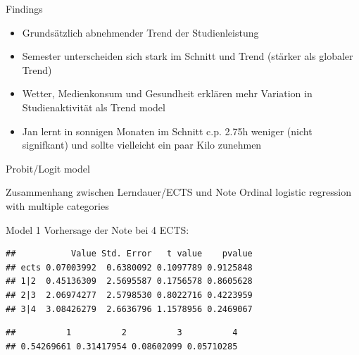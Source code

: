 \documentclass[
  ignorenonframetext,
]{beamer}
\providecommand{\tightlist}{%
  \setlength{\itemsep}{0pt}\setlength{\parskip}{0pt}}
\begin{document}
\begin{frame}
\begin{block}{Findings}
\protect\hypertarget{findings}{}
\begin{itemize}
\tightlist
\item
  Grundsätzlich abnehmender Trend der Studienleistung
\item
  Semester unterscheiden sich stark im Schnitt und Trend (stärker als
  globaler Trend)
\item
  Wetter, Medienkonsum und Gesundheit erklären mehr Variation in
  Studienaktivität als Trend model
\item
  Jan lernt in sonnigen Monaten im Schnitt c.p. 2.75h weniger (nicht
  signifkant) und sollte vielleicht ein paar Kilo zunehmen
\end{itemize}
\end{block}
\end{frame}

\begin{frame}[fragile]{Probit/Logit model}
\protect\hypertarget{probitlogit-model}{}
\begin{block}{Zusammenhang zwischen Lerndauer/ECTS und Note}
\protect\hypertarget{zusammenhang-zwischen-lerndauerects-und-note}{}
Ordinal logistic regression with multiple categories
\end{block}

\begin{block}{Model 1}
\protect\hypertarget{model-1}{}
Vorhersage der Note bei 4 ECTS:

\begin{verbatim}
##           Value Std. Error   t value    pvalue
## ects 0.07003992  0.6380092 0.1097789 0.9125848
## 1|2  0.45136309  2.5695587 0.1756578 0.8605628
## 2|3  2.06974277  2.5798530 0.8022716 0.4223959
## 3|4  3.08426279  2.6636796 1.1578956 0.2469067
\end{verbatim}

\begin{verbatim}
##          1          2          3          4 
## 0.54269661 0.31417954 0.08602099 0.05710285
\end{verbatim}
\end{block}
\end{frame}
\end{document}
